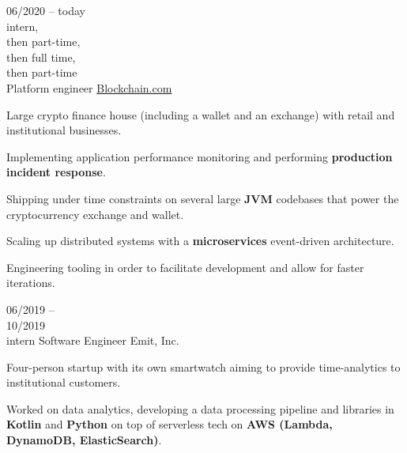 \begin{entrylist}
    \entry
    {
        06/2020 -- today\\\footnotesize{intern,\\then part-time, \\then full time, \\then part-time}\\
    }
    {Platform engineer}
    {\href{https://blockchain.com/about}{Blockchain.com}}
    {
        Large crypto finance house (including a wallet and an exchange) with retail and
    institutional businesses.

    \para
    Implementing application performance monitoring and performing \textbf{production incident response}.

    \para
    Shipping under time constraints on several large \textbf{JVM} codebases that power the
    cryptocurrency exchange and wallet.

    \para
    Scaling up distributed systems with a \textbf{microservices} event-driven architecture.

    \para
    Engineering tooling in order to facilitate development and allow for faster iterations.
    }
    \entry
    {06/2019 -- \\ 10/2019\\\footnotesize{intern}}
    {Software Engineer}
    {Emit, Inc.}
    {
        Four-person startup with its own smartwatch aiming to provide time-analytics to
        institutional customers.

        \para
        Worked on data analytics, developing a data processing pipeline and libraries in
    \textbf{Kotlin} and \textbf{Python} on top of serverless tech on \textbf{AWS (Lambda,
        DynamoDB, ElasticSearch)}.
    }
\end{entrylist}
